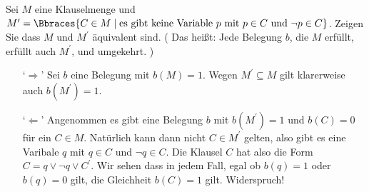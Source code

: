 
\begin{exercise}[45]

Sei $M$ eine Klauselmenge und $M^\prime = \Bbraces{C \in M \mid \text{es gibt keine Variable}~ p ~\text{mit}~ p \in C ~\text{und}~ \neg p \in C}$.
Zeigen Sie dass $M$ und $M^\prime$ äquivalent sind.
(
    Das heißt:
    Jede Belegung $b$, die $M$ erfüllt, erfüllt auch $M^\prime$, und umgekehrt.
)

\end{exercise}


\begin{solution}
\phantom{}
\begin{enumerate}
	\item[`$\Rightarrow$'] Sei $b$ eine Belegung mit $b(M) = 1$. Wegen $M^\prime \subseteq M$ gilt klarerweise auch $b(M^\prime) = 1$.
	\item[`$\Leftarrow$'] Angenommen es gibt eine Belegung $b$ mit $b(M^\prime) = 1$ und $b(C) = 0$ für ein $C \in M$. Natürlich kann dann nicht $C \in M^\prime$ gelten, also gibt es eine Varibale $q$ mit $q \in C$ und $\neg q \in C$. Die Klausel $C$ hat also die Form $ C = q \lor \neg q \lor C^\prime$. Wir sehen dass in jedem Fall, egal ob $b(q) = 1$ oder $b(q) = 0$ gilt, die Gleichheit $b(C) = 1$ gilt. Widerspruch!
\end{enumerate}
\end{solution}

